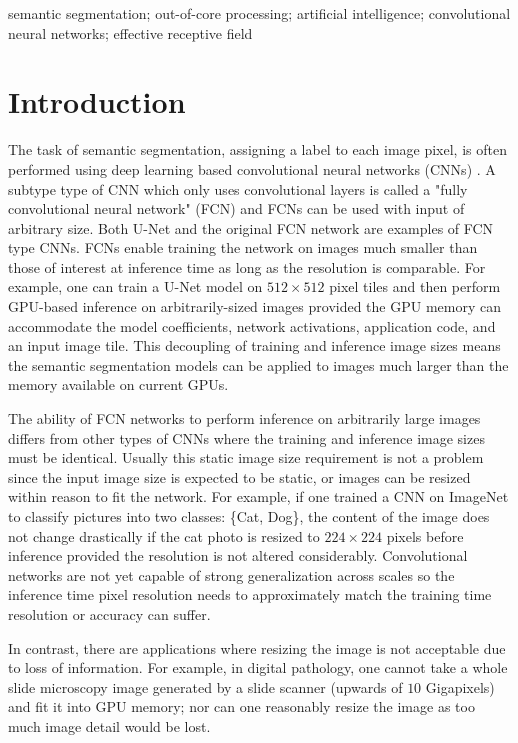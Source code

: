 \documentclass[twoside,11pt]{article}
\begin{document}
\begin{keywords}
	semantic segmentation; out-of-core processing; artificial intelligence; convolutional neural networks; effective receptive field
\end{keywords}


\section{Introduction}

The task of semantic segmentation, assigning a label to each image pixel, is often performed using deep learning based convolutional neural networks (CNNs) \citep{Badrinarayanan2015a,Ronneberger2015a}. A subtype type of CNN which only uses convolutional layers is called a "fully convolutional neural network" (FCN) and FCNs can be used with input of arbitrary size. Both U-Net \citep{Ronneberger2015a} and the original FCN network \citep{Long2015} are examples of FCN type CNNs. 
FCNs enable training the network on images much smaller than those of interest at inference time as long as the resolution is comparable. 
For example, one can train a U-Net model on $512 \times 512$ pixel tiles and then perform GPU-based inference on arbitrarily-sized images provided the GPU memory can accommodate the model coefficients, network activations, application code, and an input image tile. This decoupling of training and inference image sizes means the semantic segmentation models can be applied to images much larger than the memory available on current GPUs. 

The ability of FCN networks to perform inference on arbitrarily large images differs from other types of CNNs where the training and inference image sizes must be identical. Usually this static image size requirement is not a problem since the input image size is expected to be static, or images can be resized within reason to fit the network. For example, if one trained a CNN on ImageNet \citep{Russakovsky2015} to classify pictures into two classes: \{Cat, Dog\}, the content of the image does not change drastically if the cat photo is resized to $224 \times 224$ pixels before inference provided the resolution is not altered considerably. Convolutional networks are not yet capable of strong generalization across scales \citep{Jaderberg2015,Lin2017a} so the inference time pixel resolution needs to approximately match the training time resolution or accuracy can suffer.

In contrast, there are applications where resizing the image is not acceptable due to loss of information. For example, in digital pathology, one cannot take a whole slide microscopy image generated by a slide scanner (upwards of $\num{10}$ Gigapixels) and fit it into GPU memory; nor can one reasonably resize the image as too much image detail would be lost. 
\end{document}
